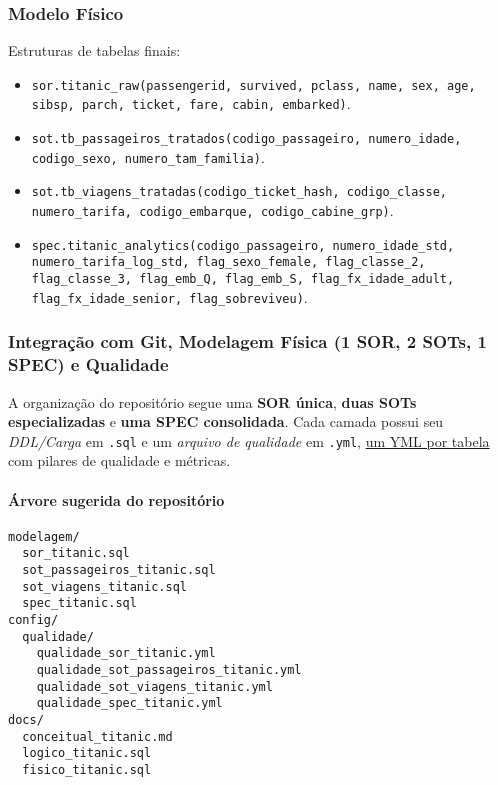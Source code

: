 \documentclass[12pt,a4paper]{article}
\begin{document}
\subsubsection*{Modelo Físico}
Estruturas de tabelas finais:
\begin{itemize}
    \item \texttt{sor.titanic\_raw(passengerid, survived, pclass, name, sex, age, sibsp, parch, ticket, fare, cabin, embarked)}.
    \item \texttt{sot.tb\_passageiros\_tratados(codigo\_passageiro, numero\_idade, codigo\_sexo, numero\_tam\_familia)}.
    \item \texttt{sot.tb\_viagens\_tratadas(codigo\_ticket\_hash, codigo\_classe, numero\_tarifa, codigo\_embarque, codigo\_cabine\_grp)}.
    \item \texttt{spec.titanic\_analytics(codigo\_passageiro, numero\_idade\_std, numero\_tarifa\_log\_std, flag\_sexo\_female, flag\_classe\_2, flag\_classe\_3, flag\_emb\_Q, flag\_emb\_S, flag\_fx\_idade\_adult, flag\_fx\_idade\_senior, flag\_sobreviveu)}.
\end{itemize}

\subsubsection*{Integração com Git, Modelagem Física (1 SOR, 2 SOTs, 1 SPEC) e Qualidade}

A organização do repositório segue uma \textbf{SOR única}, \textbf{duas SOTs especializadas} e \textbf{uma SPEC consolidada}. Cada camada possui seu \textit{DDL/Carga} em \texttt{.sql} e um \textit{arquivo de qualidade} em \texttt{.yml}, \underline{um YML por tabela} com pilares de qualidade e métricas.

\paragraph{Árvore sugerida do repositório}
\begin{verbatim}
modelagem/
  sor_titanic.sql
  sot_passageiros_titanic.sql
  sot_viagens_titanic.sql
  spec_titanic.sql
config/
  qualidade/
    qualidade_sor_titanic.yml
    qualidade_sot_passageiros_titanic.yml
    qualidade_sot_viagens_titanic.yml
    qualidade_spec_titanic.yml
docs/
  conceitual_titanic.md
  logico_titanic.sql
  fisico_titanic.sql
\end{verbatim}

\end{document}
